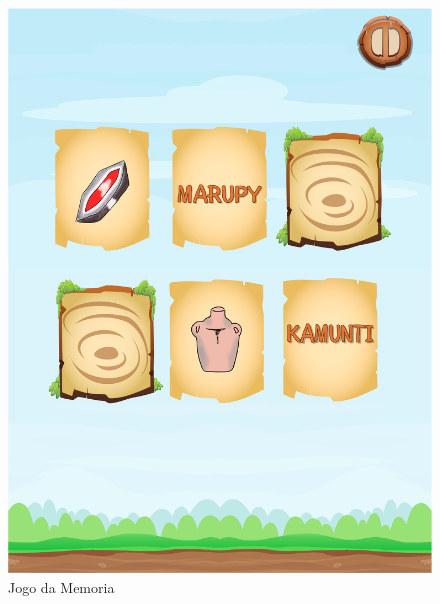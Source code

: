 \documentclass[12pt]{article}
\begin{document}
		\begin{figure}[!htb]
			\includegraphics[width=\linewidth]{IMG/memoryGame2.png}
			\caption{Jogo da Memoria}\label{fig:exampleFig6}
			\endminipage\hfill

\end{figure}
\end{document}
